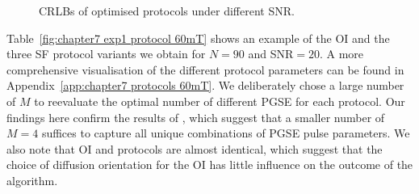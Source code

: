 \begin{figure}[H]
	\centering
	
	\caption{CRLBs of optimised protocols under different SNR.}
	\label{fig:chapter7 exp1 SNR vs CRLB}
\end{figure}
Table~\ref{fig:chapter7 exp1 protocol 60mT} shows an example of the \gls{OI}{} and the three \gls{SF}{} protocol variants we obtain for $N=90$ and SNR$=20$. A more comprehensive visualisation of the different protocol parameters can be found in Appendix~\ref{app:chapter7 protocols 60mT}. We deliberately chose a large number of $M$ to reevaluate the optimal number of different PGSE for each protocol. Our findings here confirm the results of \citet{Alexander:2008}, which suggest that a smaller number of $M=4$ suffices to capture all unique combinations of PGSE pulse parameters. We also note that {\gls{OI}} and {\SD} protocols are almost identical, which suggest that the choice of diffusion orientation for the {\gls{OI}} has little influence on the outcome of the algorithm.
